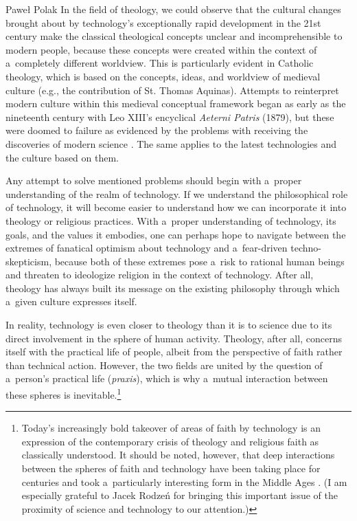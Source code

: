\begin{artengenv}{Paweł Polak}
In the field of theology, we could observe that the cultural changes brought about by technology's exceptionally rapid development in the 21st century make the classical theological concepts unclear and incomprehensible to modern people, because these concepts were created within the context of a~completely different worldview. This is particularly evident in Catholic theology, which is based on the concepts, ideas, and worldview of medieval culture (e.g., the contribution of St. Thomas Aquinas). Attempts to reinterpret modern culture within this medieval conceptual framework began as early as the nineteenth century with Leo XIII's encyclical \textit{Aeterni Patris} (1879), but these were doomed to failure as evidenced by the problems with receiving the discoveries of modern science 
\parencite[][]{polak_theory_2023}. %
 The same applies to the latest technologies and the culture based on them.



Any attempt to solve mentioned problems should begin with a~proper understanding of the realm of technology. If we understand the philosophical role of technology, it will become easier to understand how we can incorporate it into theology or religious practices. With a~proper understanding of technology, its goals, and the values it embodies, one can perhaps hope to navigate between the extremes of fanatical optimism about technology and a~fear-driven techno-skepticism, because both of these extremes pose a~risk to rational human beings and threaten to ideologize religion in the context of technology. After all, theology has always built its message on the existing philosophy through which a~given culture expresses itself.



In reality, technology is even closer to theology than it is to science due to its direct involvement in the sphere of human activity. Theology, after all, concerns itself with the practical life of people, albeit from the perspective of faith rather than technical action. However, the two fields are united by the question of a~person's practical life (\textit{praxis}), which is why a~mutual interaction between these spheres is inevitable.\footnote{Today's increasingly bold takeover of areas of faith by technology 
\parencite[see, e.g.,][]{wildman_spirit_2021} %
 is an expression of the contemporary crisis of theology and religious faith as classically understood. It should be noted, however, that deep interactions between the spheres of faith and technology have been taking place for centuries and took a~particularly interesting form in the Middle Ages 
\parencite[][]{ovitt_restoration_1987}. %
 (I am especially grateful to Jacek Rodzeń for bringing this important issue of the proximity of science and technology to our attention.)}




\end{artengenv}
